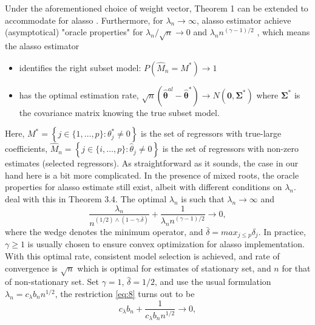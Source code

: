 \documentclass[12pt,a4paper]{article}
\begin{document}
Under the aforementioned choice of weight vector, Theorem 1 can be extended to accommodate for alasso \citep{knight2000asymptotics}. Furthermore, for $\lambda_n \rightarrow \infty $, alasso estimator achieve (asymptotical) "oracle properties" for $ \lambda_n/\sqrt{n} \rightarrow 0 $ and $ \lambda_nn^{(\gamma - 1)/2} $ \citep{zou2006adaptive}, which means the alasso estimator
\begin{itemize}
	\item identifies the right subset model: $ P(\hat{M}_n = M^*) \rightarrow 1 $
	\item has the optimal estimation rate, $\sqrt{n}(\hat{\bm{\theta}}^{al} - \hat{\bm{\theta}}^*) \rightarrow N(\bm{0}, \bm{\Sigma}^*) $  where $ \bm{\Sigma}^* $ is the covariance matrix knowing the true subset model.
\end{itemize}
Here, $ M^* = \left\lbrace j \in \{1, \ldots, p\}: \theta^*_j \neq 0 \right\rbrace $ is the set of regressors with true-large coefficients, $ \hat{M}_n = \left\lbrace j \in \{i, \ldots, p\}:\hat{\theta}_j \neq 0 \right\rbrace $ is the set of regressors with non-zero estimates (selected regressors). As straightforward as it sounds, the case in our hand here is a bit more complicated. In the presence of mixed roots, the oracle properties for alasso estimate still exist, albeit with different conditions on $ \lambda_n $. \cite{lee2018lasso} deal with this in Theorem 3.4. The optimal $ \lambda_n $ is such that $ \lambda_n \rightarrow \infty $ and
\begin{equation}\label{eq:8}
	\frac{\lambda_n}{n^{(1 / 2) \wedge (1 - \gamma.\bar{\delta})}} + 
	\frac{1}{\lambda_nn^{(\gamma - 1)/2}} \rightarrow 0,
\end{equation} 
where the wedge denotes the minimum operator, and $ \bar{\delta} = max_{j \leq p}\delta_j $.  In practice, $ \gamma \geq 1 $ is usually chosen to ensure convex optimization for alasso implementation. With this optimal rate, consistent model selection is achieved, and rate of convergence is $ \sqrt{n} $ which is optimal for estimates of stationary set, and $ n $ for that of non-stationary set. Set $ \gamma = 1 $, $ \hat{\delta} = 1/2 $, and use the usual formulation $ \lambda_n = c_\lambda b_n n^{1/2} $, the restriction \eqref{eq:8} turns out to be
	\begin{equation}\label{eq:9}
	c_\lambda b_n + \frac{1}{c_\lambda b_n n^{1/2}} \rightarrow 0,
	\end{equation}
\end{document}
